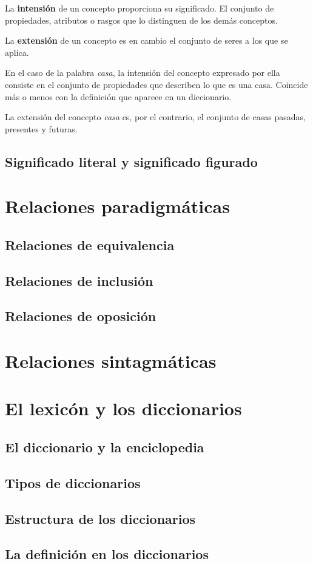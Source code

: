 \documentclass[11pt]{article}
\begin{document}
La \textbf{intensión} de un concepto proporciona su significado. El conjunto de propiedades, atributos o rasgos que lo distinguen de los demás conceptos.

La \textbf{extensión} de un concepto es en cambio el conjunto de seres a los que se aplica.

En el caso de la palabra \textit{casa}, la intensión del concepto expresado por ella consiste en el conjunto de propiedades que describen lo que es una casa. Coincide más o menos con la definición que aparece en un diccionario.

La extensión del concepto \textit{casa} es, por el contrario, el conjunto de casas pasadas, presentes y futuras.

\subsection{Significado literal y significado figurado}
\section{Relaciones paradigmáticas}
\subsection{Relaciones de equivalencia}
\subsection{Relaciones de inclusión}
\subsection{Relaciones de oposición}
\section{Relaciones sintagmáticas}
\section{El lexicón y los diccionarios}
\subsection{El diccionario y la enciclopedia}
\subsection{Tipos de diccionarios}
\subsection{Estructura de los diccionarios}
\subsection{La definición en los diccionarios}
\end{document}
